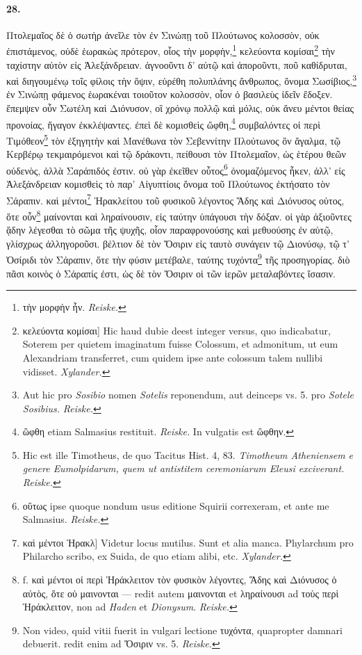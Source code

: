 \documentclass[a4paper, 11pt, oneside, polutonikogreek, german, landscape]{article}
\begin{document}
\paragraph{28.}
Πτολεμαῖος δὲ ὁ σωτὴρ ἀνεῖλε τὸν ἐν Σινώπῃ τοῦ Πλούτωνος κολοσσὸν, οὐκ ἐπιστάμενος, οὐδὲ ἑωρακὼς πρότερον, οἷος τὴν μορφὴν,\footnote{τὴν μορφὴν ἦν. \emph{Reiske.}} κελεύοντα κομίσαι\footnote{κελεύοντα κομίσαι] Hic haud dubie deest integer versus, quo indicabatur, Soterem per quietem imaginatum fuisse Colossum, et admonitum, ut eum Alexandriam transferret, cum quidem ipse ante colossum talem nullibi vidisset. \emph{Xylander.}} τὴν ταχίστην αὐτὸν εἰς Ἀλεξάνδρειαν. ἀγνοοῦντι δ' αὐτῷ καὶ ἀποροῦντι, ποῦ καθίδρυται, καὶ διηγουμένῳ τοῖς φίλοις τὴν ὄψιν, εὑρέθη πολυπλάνης ἄνθρωπος, ὄνομα Σωσίβιος,\footnote{Aut hic pro \emph{Sosibio} nomen \emph{Sotelis} reponendum, aut deinceps vs. 5. pro \emph{Sotele Sosibius.} \emph{Reiske.}} ἐν Σινώπῃ φάμενος ἑωρακέναι τοιοῦτον κολοσσὸν, οἷον ὁ βασιλεὺς ἰδεῖν ἔδοξεν. ἔπεμψεν οὖν Σωτέλη καὶ Διόνυσον, οἳ χρόνῳ πολλῷ καὶ μόλις, οὐκ ἄνευ μέντοι θείας προνοίας, ἤγαγον ἐκκλέψαντες. ἐπεὶ δὲ κομισθεὶς ὤφθη,\footnote{ὢφθη etiam Salmasius restituit. \emph{Reiske.} In vulgatis est ὢφθην.} συμβαλόντες οἱ περὶ Τιμόθεον\footnote{Hic est ille Timotheus, de quo Tacitus Hist. 4, 83. \emph{Timotheum Atheniensem e genere Eumolpidarum, quem ut antistitem ceremoniarum Eleusi exciverant.} \emph{Reiske.}} τὸν ἐξηγητὴν καὶ Μανέθωνα τὸν Σεβεννίτην Πλούτωνος ὂν ἄγαλμα, τῷ Κερβέρῳ τεκμαιρόμενοι καὶ τῷ δράκοντι, πείθουσι τὸν Πτολεμαῖον, ὡς ἑτέρου θεῶν οὐδενὸς, ἀλλὰ Σαράπιδός ἐστιν. οὐ γὰρ ἐκεῖθεν οὗτος\footnote{οὕτως ipse quoque nondum usus editione Squirii correxeram, et ante me Salmasius. \emph{Reiske.}} ὀνομαζόμενος ἧκεν, ἀλλ' εἰς Ἀλεξάνδρειαν κομισθεὶς τὸ παρ' Αἰγυπτίοις ὄνομα τοῦ Πλούτωνος ἐκτήσατο τὸν Σάραπιν. καὶ μέντοι\footnote{καὶ μέντοι Ἡρακλ] Videtur locus mutilus. Sunt et alia manca. Phylarchum pro Philarcho scribo, ex Suida, de quo etiam alibi, etc. \emph{Xylander.}} Ἡρακλείτου τοῦ φυσικοῦ λέγοντος Ἅδης καὶ Διόνυσος οὑτος, ὅτε οὖν\footnote{f. καὶ μέντοι οἱ περὶ Ἡράκλειτον τὸν φυσικὸν λέγοντες, Ἅδης καὶ Διόνυσος ὁ αὐτὸς, ὅτε οὐ μαινονται --- redit autem μαινονται et ληραίνουσι ad τοὺς περὶ Ἡράκλειτον, non ad \emph{Haden} et \emph{Dionysum}. \emph{Reiske.}} μαίνονται καὶ ληραίνουσιν, εἰς ταύτην ὑπάγουσι τὴν δόξαν. οἱ γὰρ ἀξιοῦντες ᾅδην λέγεσθαι τὸ σῶμα τῆς ψυχῆς, οἷον παραφρονούσης καὶ μεθυούσης ἐν αὐτῷ, γλίσχρως ἀλληγοροῦσι. βέλτιον δὲ τὸν Ὄσιριν εἰς ταυτὸ συνάγειν τῷ Διονύσῳ, τῷ τ' Ὀσίριδι τὸν Σάραπιν, ὅτε τὴν φύσιν μετέβαλε, ταύτης τυχόντα\footnote{Non video, quid vitii fuerit in vulgari lectione τυχόντα, quapropter damnari debuerit. redit enim ad Ὄσιριν vs. 5. \emph{Reiske.}} τῆς προσηγορίας. διὸ πᾶσι κοινὸς ὁ Σάραπίς ἐστι, ὡς δὲ τὸν Ὄσιριν οἱ τῶν ἱερῶν μεταλαβόντες ἴσασιν.
\end{document}
